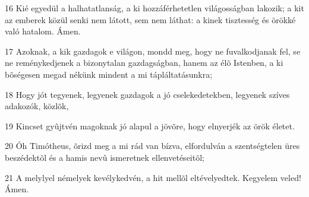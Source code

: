 \par 16 Kié egyedül a halhatatlanság, a ki hozzáférhetetlen világosságban lakozik; a kit az emberek közül senki nem látott, sem nem láthat: a kinek tisztesség és örökké való hatalom. Ámen.
\par 17 Azoknak, a kik gazdagok e világon, mondd meg, hogy ne fuvalkodjanak fel, se ne reménykedjenek a bizonytalan gazdagságban, hanem az élõ Istenben, a ki bõségesen megad nékünk mindent a mi tápláltatásunkra;
\par 18 Hogy jót tegyenek, legyenek gazdagok a jó cselekedetekben, legyenek szíves adakozók, közlõk,
\par 19 Kincset gyûjtvén magoknak jó alapul a jövõre, hogy elnyerjék az örök  életet.
\par 20 Óh Timótheus, õrizd meg a mi rád van bízva, elfordulván a szentségtelen üres beszédektõl és a hamis nevû ismeretnek ellenvetéseitõl;
\par 21 A melylyel némelyek kevélykedvén, a hit mellõl eltévelyedtek. Kegyelem veled! Ámen.


